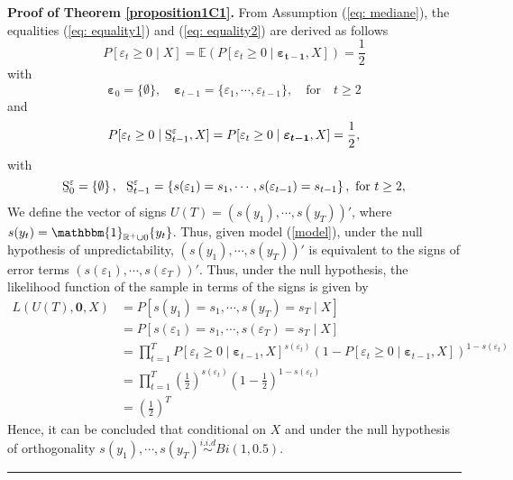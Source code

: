 \documentclass[harvard,11pt]{article}
\newcommand{\E}{\mathbb{E}}
\newenvironment{proof}[1][Proof]{\textbf{#1.} }{\  \rule{0.5em}{0.5em}}
\begin{document}
\begin{proof}[Proof of Theorem \protect\ref{proposition1C1}]
 From Assumption (\ref{eq: mediane}), the equalities (\ref{eq: equality1}) and (\ref{eq: equality2}) are derived as follows
\begin{equation}\label{eq: equality1}
P[\varepsilon_t\geq0\mid X]=\E\left(P[\varepsilon_t\geq 0\mid\bm{\varepsilon_{t-1}},X ]\right)=\frac{1}{2}
\end{equation}
with
\[
\bm{\varepsilon}_0=\{\emptyset\},\quad \bm{\varepsilon}_{t-1}=\{\varepsilon_1,\cdots,\varepsilon_{t-1}\},\quad\text{for}\quad t\geq 2
\]
and
\begin{equation}\label{eq: equality2}
P[\varepsilon_t\geq0\mid \text{\b{S}}^{\varepsilon}_{t-1}, X]=P[\varepsilon_t\geq 0\mid\bm{\varepsilon_{t-1}},X ]=\frac{1}{2},
\end{equation}
with
\[
\text{\b{S}}^{\varepsilon}_{0}=\left\{ \emptyset \right\} ,\text{ \ \b{S}}^{\varepsilon}_{t-1}=\left\{
s(\varepsilon_{1})=s_{1},\cdots,s(\varepsilon_{t-1})=s_{t-1}\right\} ,\text{ for }t\geq 2,
\]
We define the vector of signs $U(T)=(s(y_1),\cdots,s(y_T))'$, where $s(y_t)=\mathbbm{1}_{\mathbb{R}^+\cup 0}\{y_t\}$. Thus, given model (\ref{model}), under the null hypothesis of unpredictability, $(s(y_1),\cdots,s(y_T))'$ is equivalent to the signs of error terms $(s(\varepsilon_1),\cdots,s(\varepsilon_T))'$. Thus, under the null hypothesis, the likelihood function of the sample in terms of the signs is given by
\begingroup
\allowdisplaybreaks
\begin{align*}
L(U(T),\bm{0},X)&=P[s(y_1)=s_1,\cdots,s(y_T)=s_T\mid X]\\
&=P[s(\varepsilon_1)=s_1,\cdots,s(\varepsilon_T)=s_T\mid X]\\
&=\prod\limits_{t=1}^{T}P[\varepsilon_t\geq0\mid\bm{\varepsilon}_{t-1},X]^{s(\varepsilon_t)}\left(1-P[\varepsilon_t\geq0\mid\bm{\varepsilon}_{t-1},X]\right)^{1-s(\varepsilon_t)}\\
&=\prod\limits_{t=1}^{T}\left(\frac{1}{2}\right)^{s(\varepsilon_t)}\left(1-\frac{1}{2}\right)^{1-s(\varepsilon_t)}\\
&=\left(\frac{1}{2}\right)^T
\end{align*}
\endgroup
Hence, it can be concluded that conditional on $X$ and under the null hypothesis of orthogonality $s(y_1),\cdots,s(y_T)\overset{i.i.d}{\sim}Bi(1,0.5)$.
\end{proof}
\end{document}
